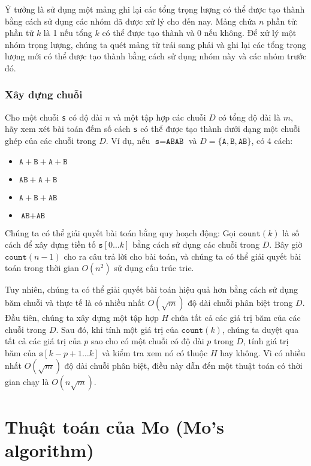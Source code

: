 Ý tưởng là sử dụng một mảng ghi lại các tổng trọng lượng
có thể được tạo thành bằng cách sử dụng các nhóm đã được xử lý cho đến nay.
Mảng chứa $n$ phần tử: phần tử $k$ là 1 nếu tổng
$k$ có thể được tạo thành và 0 nếu không.
Để xử lý một nhóm trọng lượng, chúng ta quét mảng
từ trái sang phải và ghi lại các tổng trọng lượng mới
có thể được tạo thành bằng cách sử dụng nhóm này và các nhóm trước đó.

\subsubsection{Xây dựng chuỗi}

Cho một chuỗi \texttt{s} có độ dài $n$
và một tập hợp các chuỗi $D$ có tổng độ dài là $m$,
hãy xem xét bài toán đếm số cách
\texttt{s} có thể được tạo thành dưới dạng một chuỗi ghép
của các chuỗi trong $D$.
Ví dụ,
nếu $\texttt{s}=\texttt{ABAB}$ và
$D=\{\texttt{A},\texttt{B},\texttt{AB}\}$,
có 4 cách:

\begin{itemize}[noitemsep]
\item $\texttt{A}+\texttt{B}+\texttt{A}+\texttt{B}$
\item $\texttt{AB}+\texttt{A}+\texttt{B}$
\item $\texttt{A}+\texttt{B}+\texttt{AB}$
\item $\texttt{AB}+\texttt{AB}$
\end{itemize}

Chúng ta có thể giải quyết bài toán bằng quy hoạch động:
Gọi $\texttt{count}(k)$ là số cách để xây dựng tiền tố
$\texttt{s}[0 \ldots k]$ bằng cách sử dụng các chuỗi trong $D$.
Bây giờ $\texttt{count}(n-1)$ cho ra câu trả lời cho bài toán,
và chúng ta có thể giải quyết bài toán trong thời gian $O(n^2)$
sử dụng cấu trúc trie.

Tuy nhiên, chúng ta có thể giải quyết bài toán hiệu quả hơn
bằng cách sử dụng băm chuỗi và thực tế là có
nhiều nhất $O(\sqrt m)$ độ dài chuỗi phân biệt trong $D$.
Đầu tiên, chúng ta xây dựng một tập hợp $H$ chứa tất cả
các giá trị băm của các chuỗi trong $D$.
Sau đó, khi tính một giá trị của $\texttt{count}(k)$,
chúng ta duyệt qua tất cả các giá trị của $p$
sao cho có một chuỗi có độ dài $p$ trong $D$,
tính giá trị băm của $\texttt{s}[k-p+1 \ldots k]$
và kiểm tra xem nó có thuộc $H$ hay không.
Vì có nhiều nhất $O(\sqrt m)$ độ dài chuỗi phân biệt,
điều này dẫn đến một thuật toán có thời gian chạy là $O(n \sqrt m)$.

\section{Thuật toán của Mo (Mo's algorithm)}

